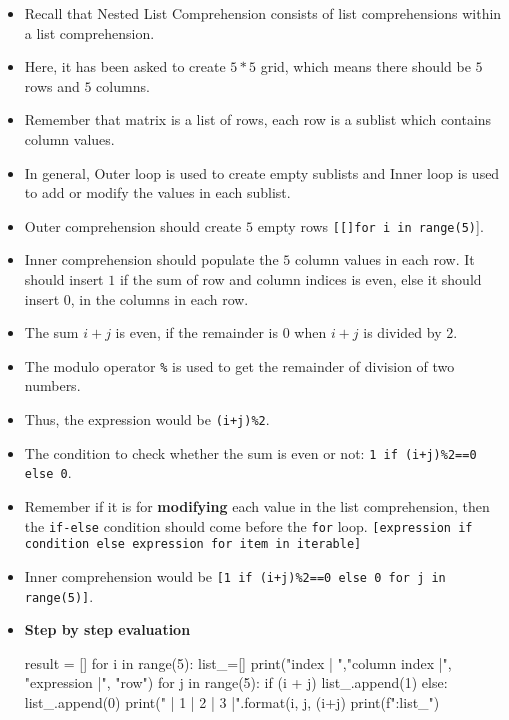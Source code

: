 \documentclass[10pt]{extarticle}
\begin{document}
\begin{itemize}
    \item Recall that Nested List Comprehension consists of list comprehensions within a list comprehension.
    \item Here, it has been asked to create $ 5*5$ grid, which means there should be $5$ rows and $5$ columns. 
    \item Remember that matrix is a list of rows, each row is a sublist which contains column values.
    \item In general, Outer loop is used to create empty sublists and Inner loop is used to add or modify the values in each sublist. 
    \item Outer comprehension should create $5$ empty rows  \colorbox{gray!20}{\texttt{[[]for i in range(5)}]}.
    \item Inner comprehension should populate the $5$ column values in each row. It should insert $1$ if the sum of row and column indices is even, else it 
    should insert $0$, in the columns in each row.
    \item The sum $i + j$ is even, if the remainder is $0$ when $i + j$  is divided by $2$.
    \item The modulo operator \colorbox{gray!20}{\texttt{\%}} is used to get the remainder of division of two numbers. 
    \item Thus, the expression would be \colorbox{gray!20}{\texttt{(i+j)\%2}}.
    \item The condition to check whether the sum is even or not: \colorbox{gray!20}{\texttt{1 if (i+j)\%2==0 else 0}}.
    \item Remember if it is for \textbf{modifying} each value in the list comprehension, then the \texttt{if-else} condition should come before the \texttt{for} loop. \colorbox{gray!20}{\texttt{[expression if condition else expression for item in iterable]}}  
    \item Inner comprehension would be \colorbox{gray!20}{\texttt{[1 if (i+j)\%2==0 else 0 for j in range(5)]}}.
    \item \textbf{Step by step evaluation} 
    \begin{tcolorbox}[colback=gray!20, colframe=gray!50, sharp corners=southwest]
    \begin{pycode}
result = []
for i in range(5):
  list_=[]
  print("\nrow index | ","column index |", "expression |", "row")
  for j in range(5):
    if (i + j) %
      list_.append(1)
    else:
      list_.append(0)
    print("  |  {1}  |  {2}  |  {3}  |".format(i, j, (i+j)%
  print(f"\nRow:{list_}")    
 

    \end{pycode}
    \end{tcolorbox}
\end{itemize}
\end{document}
